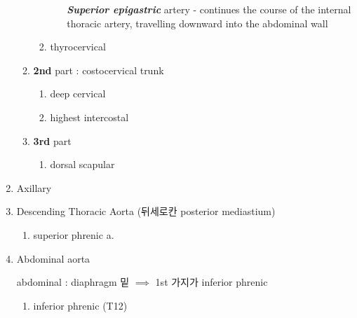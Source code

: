 \documentclass[10pt]{amsart}
\numberwithin{theorem}{section}
\numberwithin{example}{section}
\theoremstyle{definition}
\theoremstyle{remark}
\begin{document}
\begin{enumerate}
\begin{enumerate}
\begin{enumerate}
\begin{itemize}
\textit{\textbf{Superior epigastric}} artery - continues the course of the internal thoracic artery, travelling downward into the abdominal wall
        \end{itemize}
        \item thyrocervical 
    \end{enumerate}
    
    \item \textbf{2nd} part 
 :     costocervical trunk
    \begin{enumerate}
        \item deep cervical 
        
        \item highest intercostal 
    \end{enumerate}
    
    \item \textbf{3rd} part 
    
    \begin{enumerate}
        \item dorsal scapular 
    \end{enumerate}
\end{enumerate}


\vspace{3pt}


\item  Axillary 



\vspace{3pt}

\item Descending Thoracic Aorta (뒤세로칸 posterior mediastium)

\vspace{3pt}

\begin{enumerate}
    \item 
    superior phrenic a. 
    
\end{enumerate}

\vspace{3pt}

\item Abdominal aorta


abdominal : diaphragm 밑  $\implies $ 1st 가지가 inferior phrenic


\begin{enumerate}
\item inferior phrenic (T12)

\vspace{1.5pt}


\end{enumerate}
\end{enumerate}
\end{document}
